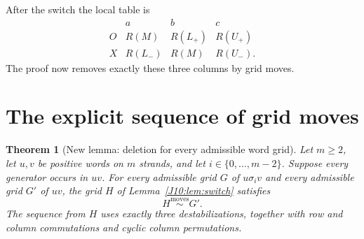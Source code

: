 \documentclass[11pt,oneside]{report}
\newtheorem{theorem}{Theorem}[section]
\theoremstyle{definition}
\numberwithin{equation}{section}
\newcommand{\Mov}{\mathrel{\stackrel{\mathrm{moves}}{\sim}}}
\begin{document}
After the switch the local table is
\begin{equation}\label{J10:eq:switched}
\begin{array}{c|ccc}
 &a&b&c\\ \hline
 O&R(M)&R(L_+)&R(U_+)\\
 X&R(L_-)&R(M)&R(U_-).
\end{array}
\end{equation}
The proof now removes exactly these three columns by grid moves.

\section{The explicit sequence of grid moves}

\begin{theorem}[New lemma: deletion for every admissible word grid]
\label{J10:thm:deletion}
Let $m\ge2$, let $u,v$ be positive words on $m$ strands, and let
$i\in\{0,\ldots,m-2\}$. Suppose every generator occurs in $uv$.
For every admissible grid $G$ of $u\sigma_i v$ and every admissible
grid $G'$ of $uv$, the grid $H$ of Lemma~\ref{J10:lem:switch} satisfies
\[
 H\Mov G'.
\]
The sequence from $H$ uses exactly three destabilizations, together
with row and column commutations and cyclic column permutations.
\end{theorem}
\end{document}

